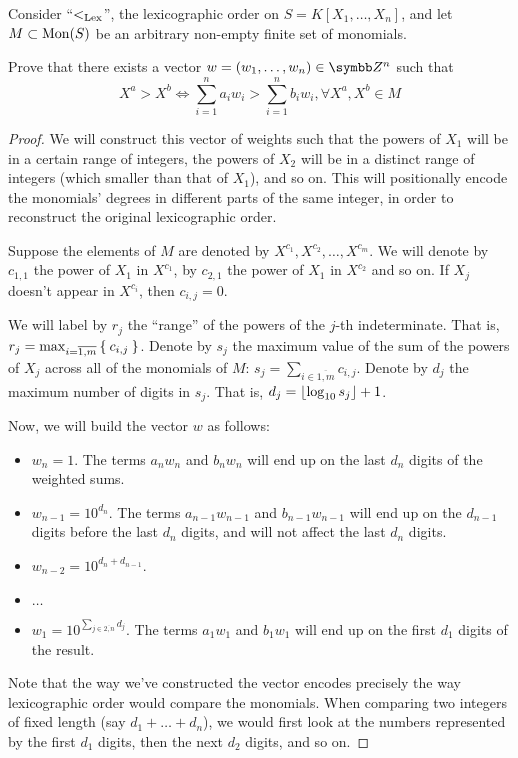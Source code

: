 \begin{problem}
Consider ``\(<_\mathrm{Lex}\)'', the lexicographic order on \(S = K[X_1, \dots, X_n]\), and let \(M \subset \operatorname{Mon}(S)\) be an arbitrary non-empty finite set of monomials.

Prove that there exists a vector \(w = (w_1, \dots, w_n) \in \integers^n\) such that
\[
    X^a > X^b \iff \sum_{i = 1}^{n} a_i w_i > \sum_{i = 1}^{n} b_i w_i, \forall X^a, X^b \in M
\]
\end{problem}
\begin{proof}
We will construct this vector of weights such that the powers of \(X_1\) will be in a certain range of integers, the powers of \(X_2\) will be in a distinct range of integers (which smaller than that of \(X_1\)), and so on. This will positionally encode the monomials' degrees in different parts of the same integer, in order to reconstruct the original lexicographic order.

Suppose the elements of \(M\) are denoted by \(X^{c_1}, X^{c_2}, \dots, X^{c_m}\). We will denote by \(c_{1, 1}\) the power of \(X_1\) in \(X^{c_1}\), by \(c_{2, 1}\) the power of \(X_1\) in \(X^{c_2}\) and so on. If \(X_j\) doesn't appear in \(X^{c_i}\), then \(c_{i, j} = 0\).

We will label by \(r_j\) the ``range'' of the powers of the \(j\)-th indeterminate. That is, \(r_j = \max_{i = \overline{1, m}} \Set{ c_{i, j} } \). Denote by \(s_j\) the maximum value of the sum of the powers of \(X_j\) across all of the monomials of \(M\): \(s_j = \sum_{i \in \overline{1, m}} c_{i, j}\). Denote by \(d_j\) the maximum number of digits in \(s_j\). That is, \(d_j = \lfloor\log_{10} s_j\rfloor + 1\).

Now, we will build the vector \(w\) as follows:
\begin{itemize}
    \item \(w_n = 1\). The terms \(a_n w_n\) and \(b_n w_n\) will end up on the last \(d_n\) digits of the weighted sums.
    \item \(w_{n - 1} = 10^{d_n}\). The terms \(a_{n - 1} w_{n - 1}\) and \(b_{n - 1} w_{n - 1}\) will end up on the \(d_{n - 1}\) digits before the last \(d_n\) digits, and will not affect the last \(d_n\) digits.
    \item \(w_{n - 2} = 10^{d_n + d_{n-1}}\).
    \item \(\dots\)
    \item \(w_1 = 10^{\sum_{j \in \overline{2, n}} {d_j}}\). The terms \(a_1 w_1\) and \(b_1 w_1\) will end up on the first \(d_1\) digits of the result.
\end{itemize}

Note that the way we've constructed the vector encodes precisely the way lexicographic order would compare the monomials. When comparing two integers of fixed length (say \(d_1 + \dots + d_n\)), we would first look at the numbers represented by the first \(d_1\) digits, then the next \(d_2\) digits, and so on.
\end{proof}

